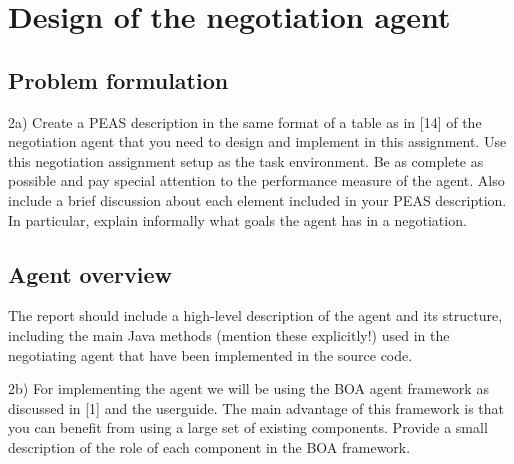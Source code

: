 \chapter{Design of the negotiation agent}
\section{Problem formulation}
2a) Create a PEAS description in the same format of a table as in [14] of the negotiation agent that you need to design and implement in this assignment. Use this negotiation assignment setup as the task environment. Be as complete as possible and pay special attention to the performance measure of the agent. Also include a brief discussion about each element included in your PEAS description. In particular, explain informally what goals the agent has in a negotiation.

\section{Agent overview}

The report should include a high-level description of the agent and its structure, including the main Java methods (mention these explicitly!) used in the negotiating agent that have been implemented in the source code.

2b) For implementing the agent we will be using the BOA agent framework as discussed in [1] and the userguide. The main advantage of this framework is that you can benefit from using a large set of existing components. Provide a small description of the role of each component in the BOA framework.